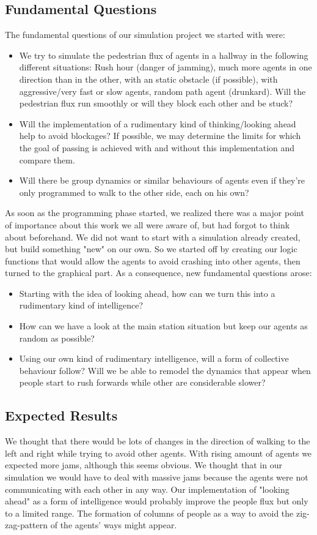 \subsection{Fundamental Questions}
The fundamental questions of our simulation project we started with were:
\begin{itemize}
\item We try to simulate the pedestrian flux of agents in a hallway in the following different situations: Rush hour (danger of jamming), much more agents in one direction than in the other, with an static obstacle (if possible), with aggressive/very fast or slow agents, random path agent (drunkard). Will the pedestrian flux run smoothly or will they block each other and be stuck?
\item Will the implementation of a rudimentary kind of thinking/looking ahead help to avoid blockages? If possible, we may determine the limits for which the goal of passing is achieved with and without this implementation and compare them.
\item Will there be group dynamics or similar behaviours of agents even if they're only programmed to walk to the other side, each on his own?
\end{itemize}

\noi As soon as the programming phase started, we realized there was a major point of importance about this work we all were aware of, but had forgot to think about beforehand. We did not want to start with a simulation already created, but build something "new" on our own. So we started off by creating our logic functions that would allow the agents to avoid crashing into other agents, then turned to the graphical part. As a consequence, new fundamental questions arose:
\begin{itemize}
\item Starting with the idea of looking ahead, how can we turn this into a rudimentary kind of intelligence?
\item How can we have a look at the main station situation but keep our agents as random as possible?
\item Using our own kind of rudimentary intelligence, will a form of collective behaviour follow? Will we be able to remodel the dynamics that appear when people start to rush forwards while other are considerable slower?
\end{itemize}

\subsection{Expected Results}
We thought that there would be lots of changes in the direction of walking to the left and right while trying to avoid other agents. With rising amount of agents we expected more jams, although this seems obvious. We thought that in our simulation we would have to deal with massive jams because the agents were not communicating with each other in any way. Our implementation of "looking ahead" as a form of intelligence would probably improve the people flux but only to a limited range. The formation of columns of people as a way to avoid the zig-zag-pattern of the agents' ways might appear.
